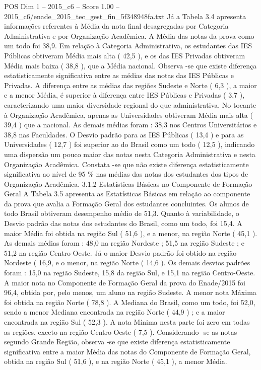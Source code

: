 \begin{textsample}{POS Dim 1 – 2015\_c6 – Score 1.00 – 2015\_c6/enade\_2015\_tec\_gest\_fin\_5f348948fa.txt}
Já a Tabela 3.4 apresenta informações referentes à Média da nota final desagregadas por Categoria Administrativa e por Organização Acadêmica.
A Média das notas da prova como um todo foi 38,9.
Em relação à Categoria Administrativa, os estudantes das IES Públicas obtiveram Média mais alta ( 42,5 ), e os das IES Privadas obtiveram Média mais baixa ( 38,8 ), que a Média nacional.
Observa -se que existe diferença estatisticamente significativa entre as médias das notas das IES Públicas e Privadas.
A diferença entre as médias das regiões Sudeste e Norte ( 6,3 ), a maior e a menor Média, é superior à diferença entre IES Públicas e Privadas ( 3,7 ), caracterizando uma maior diversidade regional do que administrativa.
No tocante à Organização Acadêmica, apenas as Universidades obtiveram Média mais alta ( 39,4 ) que a nacional.
As demais médias foram : 38,3 nos Centros Universitários e 38,8 nas Faculdades.
O Desvio padrão para as IES Públicas ( 13,4 ) e para as Universidades ( 12,7 ) foi superior ao do Brasil como um todo ( 12,5 ), indicando uma dispersão um pouco maior das notas nesta Categoria Administrativa e nesta Organização Acadêmica.
Constata -se que não existe diferença estatisticamente significativa ao nível de 95 \% nas médias das notas dos estudantes dos tipos de Organização Acadêmica. 3.1.2 Estatísticas Básicas no Componente de Formação Geral A Tabela 3.5 apresenta as Estatísticas Básicas em relação ao componente da prova que avalia a Formação Geral dos estudantes concluintes.
Os alunos de todo Brasil obtiveram desempenho médio de 51,3.
Quanto à variabilidade, o Desvio padrão das notas dos estudantes do Brasil, como um todo, foi 15,4.
A maior Média foi obtida na região Sul ( 51,6 ), e a menor, na região Norte ( 45,1 ).
As demais médias foram : 48,0 na região Nordeste ; 51,5 na região Sudeste ; e 51,2 na região Centro-Oeste.
Já o maior Desvio padrão foi obtido na região Nordeste ( 16,9, e o menor, na região Norte ( 14,6 ).
Os demais desvios padrões foram : 15,0 na região Sudeste, 15,8 da região Sul, e 15,1 na região Centro-Oeste.
A maior nota no Componente de Formação Geral da prova do Enade/2015 foi 96,4, obtida por, pelo menos, um aluno na região Sudeste.
A menor nota Máxima foi obtida na região Norte ( 78,8 ).
A Mediana do Brasil, como um todo, foi 52,0, sendo a menor Mediana encontrada na região Norte ( 44,9 ) ; e a maior encontrada na região Sul ( 52,3 ).
A nota Mínima nesta parte foi zero em todas as regiões, exceto na região Centro-Oeste ( 7,5 ).
Considerando -se as notas segundo Grande Região, observa -se que existe diferença estatisticamente significativa entre a maior Média das notas do Componente de Formação Geral, obtida na região Sul ( 51,6 ), e na região Norte ( 45,1 ), a menor Média.

\end{textsample}
